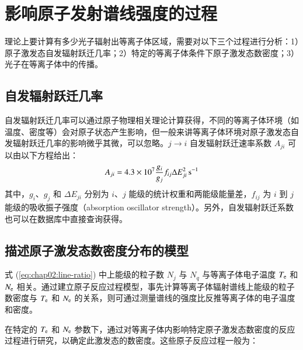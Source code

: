\section{影响原子发射谱线强度的过程}

理论上要计算有多少光子辐射出等离子体区域，需要对以下三个过程进行分析：1）原子激发态自发辐射跃迁几率；2）特定的等离子体条件下原子激发态数密度；3）光子在等离子体中的传播。

\subsection{自发辐射跃迁几率}
\label{sec:chap02:Aji}

自发辐射跃迁几率可以通过原子物理相关理论计算获得，不同的等离子体环境（如温度、密度等）会对原子状态产生影响，但一般来讲等离子体环境对原子激发态自发辐射跃迁几率的影响微乎其微，可以忽略。$j\to i$ 自发辐射跃迁速率系数 $A_{ji}$ 可以由以下方程给出\cite{Kolb1964:A-formular}：
\begin{equation}
  A_{ji}=4.3\times10^7\frac{g_i}{g_j}f_{ij}\Delta E_{ji}^2\,{\rm s}^{-1}
\end{equation}
其中，$g_i$、$g_j$ 和 $\Delta E_{ji}$ 分别为 $i$、$j$ 能级的统计权重和两能级能量差，$f_{ij}$ 为 $i$ 到 $j$ 能级的吸收振子强度（absorption oscillator strength）\cite{Johnson1972:collisionalstrength}。另外，自发辐射跃迁系数也可以在数据库\cite{NISTdatabase}中直接查询获得。

\subsection{描述原子激发态数密度分布的模型}

式 (\ref{eq:chap02:line-ratio}) 中上能级的粒子数 $N_j$ 与 $N_q$ 与等离子体电子温度 $T_{\rm e}$ 和 $N_{\rm e}$ 相关。通过建立原子反应过程模型，事先计算等离子体辐射谱线上能级的粒子数密度与 $T_{\rm e}$ 和 $N_{\rm e}$ 的关系，则可通过测量谱线的强度比反推等离子体的电子温度和密度。

在特定的 $T_{\rm e}$ 和 $N_{\rm e}$ 参数下，通过对等离子体内影响特定原子激发态数密度的反应过程进行研究，以确定此激发态的数密度。这些原子反应过程一般为\cite{atomicprocesses,YuChangxuan:book}：

